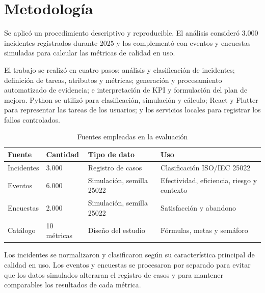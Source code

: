 \section{Metodología}

Se aplicó un procedimiento descriptivo y reproducible. El análisis consideró 3.000 incidentes registrados durante 2025 y los complementó con eventos y encuestas simuladas para calcular las métricas de calidad en uso.

El trabajo se realizó en cuatro pasos: análisis y clasificación de incidentes; definición de tareas, atributos y métricas; generación y procesamiento automatizado de evidencia; e interpretación de KPI y formulación del plan de mejora. Python se utilizó para clasificación, simulación y cálculo; React y Flutter para representar las tareas de los usuarios; y los servicios locales para registrar los fallos controlados.

\begin{table}[H]
\centering
\caption{Fuentes empleadas en la evaluación}
\begin{tabularx}{\textwidth}{p{3cm}p{2.2cm}YY}
\toprule
Fuente & Cantidad & Tipo de dato & Uso \\
\midrule
Incidentes & 3.000 & Registro de casos & Clasificación ISO/IEC 25022 \\
Eventos & 6.000 & Simulación, semilla 25022 & Efectividad, eficiencia, riesgo y contexto \\
Encuestas & 2.000 & Simulación, semilla 25022 & Satisfacción y abandono \\
Catálogo & 10 métricas & Diseño del estudio & Fórmulas, metas y semáforo \\
\bottomrule
\end{tabularx}
\end{table}

Los incidentes se normalizaron y clasificaron según su característica principal de calidad en uso. Los eventos y encuestas se procesaron por separado para evitar que los datos simulados alteraran el registro de casos y para mantener comparables los resultados de cada métrica.
